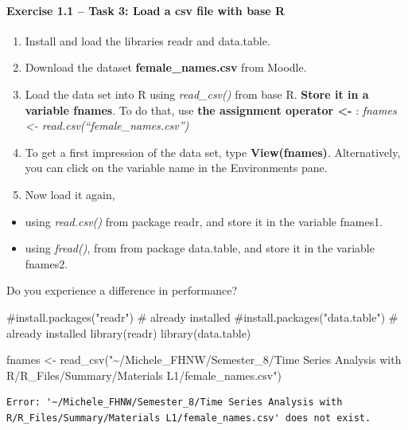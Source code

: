 \documentclass[
  letterpaper,
  DIV=11,
  numbers=noendperiod]{scrartcl}
\let\oldparagraph\paragraph
\renewcommand{\paragraph}[1]{\oldparagraph{#1}\mbox{}}
\newenvironment{Shaded}{\begin{snugshade}}{\end{snugshade}}
\newcommand{\CommentTok}[1]{\textcolor[rgb]{0.37,0.37,0.37}{#1}}
\newcommand{\FunctionTok}[1]{\textcolor[rgb]{0.28,0.35,0.67}{#1}}
\newcommand{\NormalTok}[1]{\textcolor[rgb]{0.00,0.23,0.31}{#1}}
\newcommand{\OtherTok}[1]{\textcolor[rgb]{0.00,0.23,0.31}{#1}}
\newcommand{\StringTok}[1]{\textcolor[rgb]{0.13,0.47,0.30}{#1}}
\begin{document}
\hypertarget{exercise-1.1-task-3-load-a-csv-file-with-base-r}{%
\paragraph{Exercise 1.1 -- Task 3: Load a csv file with base
R}\label{exercise-1.1-task-3-load-a-csv-file-with-base-r}}

\begin{enumerate}
\def\labelenumi{\arabic{enumi}.}
\item
  Install and load the libraries readr and data.table.
\item
  Download the dataset \textbf{female\_names.csv} from Moodle.
\item
  Load the data set into R using \emph{read\_csv()} from base R.
  \textbf{Store it in a variable fnames}. To do that, use \textbf{the
  assignment operator \textless-} : \emph{fnames \textless-
  read.csv(``female\_names.csv'')}
\item
  To get a first impression of the data set, type \textbf{View(fnames)}.
  Alternatively, you can click on the variable name in the Environments
  pane.
\item
  Now load it again,
\end{enumerate}

\begin{itemize}
\item
  using \emph{read.csv()} from package readr, and store it in the
  variable fnames1.
\item
  using \emph{fread()}, from from package data.table, and store it in
  the variable fnames2.
\end{itemize}

Do you experience a difference in performance?

\begin{Shaded}
\begin{Highlighting}[]
\CommentTok{\#install.packages("readr") \# already installed}
\CommentTok{\#install.packages("data.table") \# already installed}
\FunctionTok{library}\NormalTok{(readr)}
\FunctionTok{library}\NormalTok{(data.table)}

\NormalTok{fnames }\OtherTok{\textless{}{-}} \FunctionTok{read\_csv}\NormalTok{(}\StringTok{"\textasciitilde{}/Michele\_FHNW/Semester\_8/Time Series Analysis with R/R\_Files/Summary/Materials L1/female\_names.csv"}\NormalTok{)}
\end{Highlighting}
\end{Shaded}

\begin{verbatim}
Error: '~/Michele_FHNW/Semester_8/Time Series Analysis with R/R_Files/Summary/Materials L1/female_names.csv' does not exist.
\end{verbatim}
\end{document}
